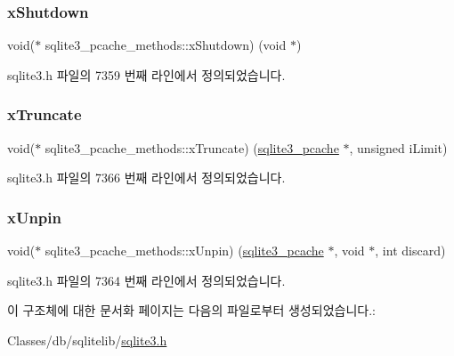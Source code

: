 \subsubsection{\texorpdfstring{x\+Shutdown}{xShutdown}}
{\footnotesize\ttfamily void($\ast$ sqlite3\+\_\+pcache\+\_\+methods\+::x\+Shutdown) (void $\ast$)}



sqlite3.\+h 파일의 7359 번째 라인에서 정의되었습니다.

\mbox{\label{structsqlite3__pcache__methods_adc097defb1e83c6442fc0d47ac79cec9}} 
\subsubsection{\texorpdfstring{x\+Truncate}{xTruncate}}
{\footnotesize\ttfamily void($\ast$ sqlite3\+\_\+pcache\+\_\+methods\+::x\+Truncate) (\hyperlink{sqlite3_8h_a096c453d937d51f7926d7d31c8e0bd2f}{sqlite3\+\_\+pcache} $\ast$, unsigned i\+Limit)}



sqlite3.\+h 파일의 7366 번째 라인에서 정의되었습니다.

\mbox{\label{structsqlite3__pcache__methods_a2aa1aefc301a0fe4998ed8397b028630}} 
\subsubsection{\texorpdfstring{x\+Unpin}{xUnpin}}
{\footnotesize\ttfamily void($\ast$ sqlite3\+\_\+pcache\+\_\+methods\+::x\+Unpin) (\hyperlink{sqlite3_8h_a096c453d937d51f7926d7d31c8e0bd2f}{sqlite3\+\_\+pcache} $\ast$, void $\ast$, int discard)}



sqlite3.\+h 파일의 7364 번째 라인에서 정의되었습니다.



이 구조체에 대한 문서화 페이지는 다음의 파일로부터 생성되었습니다.\+:\begin{DoxyCompactItemize}
\item 
Classes/db/sqlitelib/\hyperlink{sqlite3_8h}{sqlite3.\+h}\end{DoxyCompactItemize}
